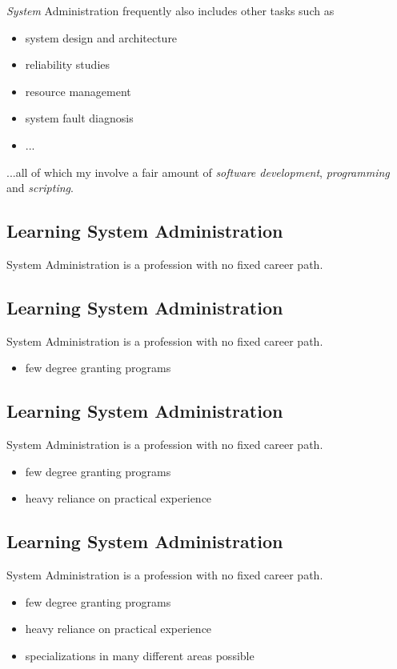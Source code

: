 \documentclass[xga]{xdvislides}
\begin{document}
{\em System} Administration frequently also includes other tasks such as
\begin{itemize}
	\item system design and architecture
	\item reliability studies
	\item resource management
	\item system fault diagnosis
	\item ...
\end{itemize}
\vspace{.5in}

...all of which my involve a fair amount of {\em software development}, {\em
programming} and {\em scripting}.

\subsection{Learning System Administration}
System Administration is a profession with no fixed career path.

\subsection{Learning System Administration}
System Administration is a profession with no fixed career path.

\begin{itemize}
	\item few degree granting programs
\end{itemize}

\subsection{Learning System Administration}
System Administration is a profession with no fixed career path.

\begin{itemize}
	\item few degree granting programs
	\item heavy reliance on practical experience
\end{itemize}

\subsection{Learning System Administration}
System Administration is a profession with no fixed career path.

\begin{itemize}
	\item few degree granting programs
	\item heavy reliance on practical experience
	\item specializations in many different areas possible
\end{itemize}
\end{document}
